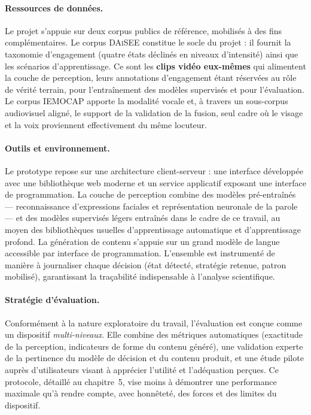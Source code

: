 \paragraph{Ressources de données.} Le projet s'appuie sur deux corpus publics de
référence, mobilisés à des fins complémentaires. Le corpus \textsc{DAiSEE}
\cite{gupta2016daisee} constitue le socle du projet : il fournit la taxonomie
d'engagement (quatre états déclinés en niveaux d'intensité) ainsi que les
scénarios d'apprentissage. Ce sont les \textbf{clips vidéo eux-mêmes} qui
alimentent la couche de perception, leurs annotations d'engagement étant réservées
au rôle de vérité terrain, pour l'entraînement des modèles supervisés et pour
l'évaluation. Le corpus \textsc{IEMOCAP} \cite{busso2008iemocap}
apporte la modalité vocale et, à travers un sous-corpus audiovisuel aligné, le
support de la validation de la fusion, seul cadre où le visage et la voix
proviennent effectivement du même locuteur.

\paragraph{Outils et environnement.} Le prototype repose sur une architecture
client-serveur : une interface développée avec une bibliothèque web moderne et un
service applicatif exposant une interface de programmation. La couche de
perception combine des modèles pré-entraînés — reconnaissance d'expressions
faciales et représentation neuronale de la parole — et des modèles supervisés
légers entraînés dans le cadre de ce travail, au moyen des bibliothèques usuelles
d'apprentissage automatique et d'apprentissage profond. La génération de
contenu s'appuie sur un grand modèle de langue accessible par interface de
programmation. L'ensemble est instrumenté de manière à journaliser chaque
décision (état détecté, stratégie retenue, patron mobilisé), garantissant la
traçabilité indispensable à l'analyse scientifique.

\paragraph{Stratégie d'évaluation.} Conformément à la nature exploratoire du
travail, l'évaluation est conçue comme un dispositif \emph{multi-niveaux}. Elle
combine des métriques automatiques (exactitude de la perception, indicateurs de
forme du contenu généré), une validation experte de la pertinence du modèle de
décision et du contenu produit, et une étude pilote auprès d'utilisateurs visant
à apprécier l'utilité et l'adéquation perçues. Ce protocole, détaillé au
chapitre~5, vise moins à démontrer une performance maximale qu'à rendre compte,
avec honnêteté, des forces et des limites du dispositif.

